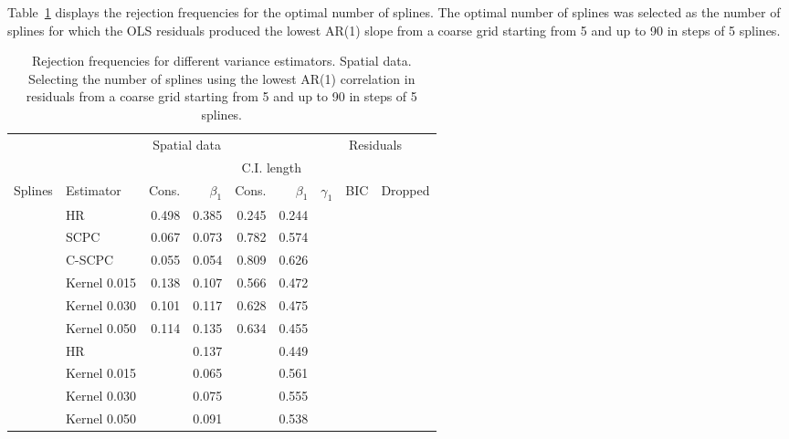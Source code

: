 \documentclass[
]{article}
\begin{document}
Table~\ref{tbl-gamma} displays the rejection frequencies for the optimal
number of splines. The optimal number of splines was selected as the
number of splines for which the OLS residuals produced the lowest AR(1)
slope from a coarse grid starting from 5 and up to 90 in steps of 5
splines.
\newpage
\hypertarget{tbl-gamma}{}
\begin{longtable}[t]{llrrrrrrr}
\caption{\label{tbl-gamma}Rejection frequencies for different variance estimators. Spatial data.
Selecting the number of splines using the lowest AR(1) correlation in
residuals from a coarse grid starting from 5 and up to 90 in steps of 5
splines. }\tabularnewline

\toprule
\multicolumn{1}{c}{ } & \multicolumn{5}{c}{Spatial data} & \multicolumn{3}{c}{Residuals} \\
\cmidrule(l{3pt}r{3pt}){2-6} \cmidrule(l{3pt}r{3pt}){7-9}
\multicolumn{4}{c}{ } & \multicolumn{2}{c}{C.I. length} \\
\cmidrule(l{3pt}r{3pt}){5-6}
Splines & Estimator & Cons. & $\beta_1$ & Cons.  & $\beta_1$  & $\gamma_1$ & BIC & Dropped\\
\midrule
 & HR & 0.498 & 0.385 & 0.245 & 0.244 &  &  & \\

 & SCPC & 0.067 & 0.073 & 0.782 & 0.574 &  &  & \\

 & C-SCPC & 0.055 & 0.054 & 0.809 & 0.626 &  &  & \\

 & Kernel 0.015 & 0.138 & 0.107 & 0.566 & 0.472 &  &  & \\

 & Kernel 0.030 & 0.101 & 0.117 & 0.628 & 0.475 &  &  & \\

\multirow[t]{-6}{*}{\raggedright\arraybackslash } & Kernel 0.050 & 0.114 & 0.135 & 0.634 & 0.455 & \multirow[t]{-6}{*}{\raggedleft\arraybackslash 0.770} & \multirow[t]{-6}{*}{\raggedleft\arraybackslash 708.622} & \multirow[t]{-6}{*}{\raggedleft\arraybackslash }\\
\cmidrule{1-9}
 & HR &  & 0.137 &  & 0.449 &  &  & \\

 & Kernel 0.015 &  & 0.065 &  & 0.561 &  &  & \\

 & Kernel 0.030 &  & 0.075 &  & 0.555 &  &  & \\

 & Kernel 0.050 &  & 0.091 &  & 0.538 &  &  & \\


\end{longtable}
\end{document}

